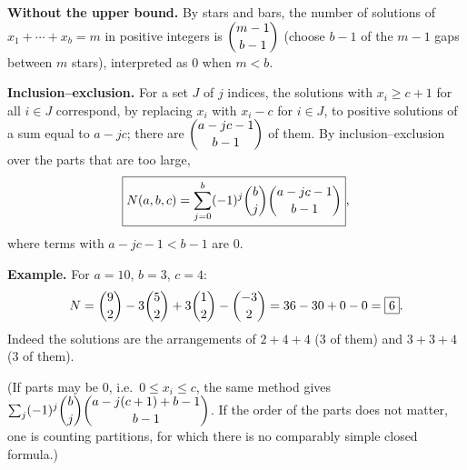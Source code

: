 \textbf{Without the upper bound.} By stars and bars, the number of solutions of $x_1+\cdots+x_b=m$ in positive integers is $\dbinom{m-1}{b-1}$ (choose $b-1$ of the $m-1$ gaps between $m$ stars), interpreted as $0$ when $m<b$.

\textbf{Inclusion--exclusion.} For a set $J$ of $j$ indices, the solutions with $x_i\ge c+1$ for all $i\in J$ correspond, by replacing $x_i$ with $x_i-c$ for $i\in J$, to positive solutions of a sum equal to $a-jc$; there are $\dbinom{a-jc-1}{b-1}$ of them. By inclusion--exclusion over the parts that are too large,
\[
\boxed{N(a,b,c)=\sum_{j=0}^{b}(-1)^j\dbinom bj\dbinom{a-jc-1}{b-1}},
\]
where terms with $a-jc-1<b-1$ are $0$.

\textbf{Example.} For $a=10$, $b=3$, $c=4$:
\[
N=\dbinom92-3\dbinom52+3\dbinom12-\dbinom{-3}{2}=36-30+0-0=\boxed{6}.
\]
Indeed the solutions are the arrangements of $2+4+4$ ($3$ of them) and $3+3+4$ ($3$ of them).

(If parts may be $0$, i.e.\ $0\le x_i\le c$, the same method gives $\sum_j(-1)^j\dbinom bj\dbinom{a-j(c+1)+b-1}{b-1}$. If the order of the parts does not matter, one is counting partitions, for which there is no comparably simple closed formula.)
